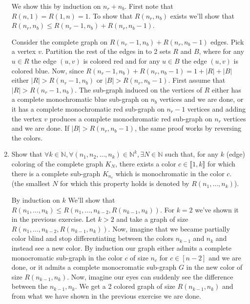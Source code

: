 \documentclass[a4paper,11pt]{exam}
\begin{document}
\begin{questions}
\begin{enumerate}
			\begin{solution}
				We show this by induction on $n_r + n_b$. First note that $R(n,1) = R(1,n)=1$.
				To show that $R(n_r,n_b)$ exists we'll show that $R(n_r, n_b) \leq R(n_r-1, n_b) + R(n_r, n_b-1)$. 
				
				Consider the complete graph on $ R(n_r-1, n_b) + R(n_r, n_b-1) $ edges. Pick a vertex $v$. Partition the rest of the edges in to 2 sets $R$ and $B$, where for any $u\in R$ the edge $(u,v)$ is colored red and for any $u\in B$ the edge $(u,v)$ is colored blue. Now, since $ R(n_r-1, n_b) + R(n_r, n_b-1) = 1 + |R|+|B|$ either $|R|>R(n_r-1, n_b)$ or $|B|>R(n_r, n_b-1)$. First assume that $|R|>R(n_r-1, n_b)$. The sub-graph induced on the vertices of $ R $ either has a complete monochromatic blue sub-graph on $ n_b $ vertices and we are done, or it has a complete monochromatic red sub-graph on $ n_r-1 $ vertices and adding the vertex $v$ produces a complete monochromatic red sub-graph on $ n_r $ vertices and we are done. If $|B|>R(n_r, n_b-1)$, the same proof works by reversing the colors.
			\end{solution}
			
			\item Show that $\forall k\in\mathbb{N},\forall (n_1, n_2, \dots,
			n_k)\in\mathbb{N}^k, \exists N\in\mathbb{N}$ such that, for any $k$ (edge) coloring of the complete graph $K_N$, there exists a color $c\in\llbracket 1,k \rrbracket$ for which there is a complete sub-graph $K_{n_c}$ which is monochromatic in the color $c$.
			\\ (the smallest $N$ for which this property holds is denoted by $R(n_1,\dots,n_k)$).
			
			\begin{solution}
				By induction on $k$ We'll show that $R(n_1,\dots,n_k)\leq R(n_1,\dots,n_{k-2},R(n_{k-1},n_k)) $. For $k=2$ we've shown it in the previous exercise.
				Let $k>2$ and take a graph of size $ R(n_1,\dots,n_{k-2},R(n_{k-1},n_k))$. Now, imagine that we became partially color blind and stop differentiating between the colors $n_{k-1}$ and $n_k$ and instead see a new color. By induction our graph either admits a complete monocromatic sub-graph in the color $c$ of size $n_c$ for $c\in [n-2]$ and we are done, or it admits a complete monocromatic sub-graph $ G $ in the new color of size $R(n_{k-1},n_k)$. Now, imagine our eyes can suddenly see the difference between the $n_{k-1},n_k$. We get a 2 colored graph of size $R(n_{k-1},n_k)$ and from what we have shown in the previous exercise we are done.
			\end{solution}
		\end{enumerate}
	\end{questions}
	
\end{document}
